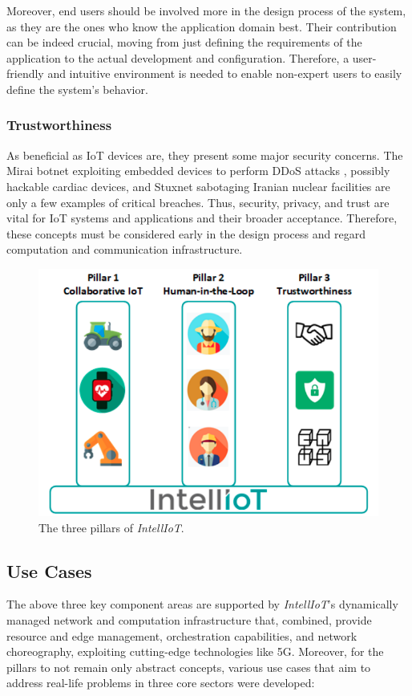 Moreover, end users should be involved more in the design process of the system, as they are the ones who know the application domain best.
Their contribution can be indeed crucial, moving from just defining the requirements of the application to the actual development and configuration.
Therefore, a user-friendly and intuitive environment is needed to enable non-expert users to easily define the system's behavior.

\subsubsection{Trustworthiness}
As beneficial as IoT devices are, they present some major security concerns.
The Mirai botnet exploiting embedded devices to perform DDoS attacks \cite{antonakakis2017understanding}, possibly hackable cardiac devices, and Stuxnet sabotaging Iranian nuclear facilities \cite{baezner2017stuxnet} are only a few examples of critical breaches.
Thus, security, privacy, and trust are vital for IoT systems and applications and their broader acceptance.
Therefore, these concepts must be considered early in the design process and regard computation and communication infrastructure.

\begin{figure}[H]
    \centering
    \includegraphics[width=0.8\linewidth]{images/intelliot-pillars.png}
    \caption{The three pillars of \textit{IntellIoT}.}
    \label{fig:intelliot-pillars}
\end{figure}

\subsection{Use Cases}
The above three key component areas are supported by \textit{IntellIoT}'s dynamically managed network and computation infrastructure that, combined, provide resource and edge management, orchestration capabilities, and network choreography, exploiting cutting-edge technologies like 5G.
Moreover, for the pillars to not remain only abstract concepts, various use cases that aim to address real-life problems in three core sectors were developed:

